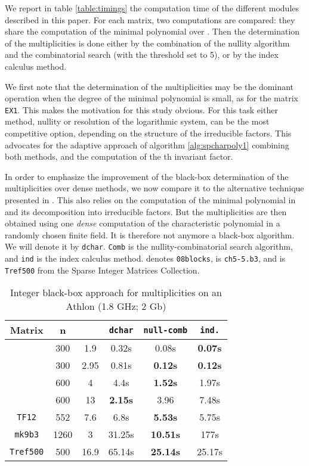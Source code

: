 \documentclass{article}
\begin{document}
We report in table \ref{table:timings} the computation time of the
different modules described in this paper. For each matrix, two computations are
compared: they share the computation of the minimal polynomial over . Then
the determination of the multiplicities is done either by the combination of the
nullity algorithm and the combinatorial search (with the threshold  set to 5), or by the index calculus method.

We first note that the determination of the multiplicities may be the dominant
operation when the degree of the minimal polynomial is small, as for the matrix
\texttt{EX1}. This makes the motivation for this study obvious.
For this task either method, nullity or resolution of the logarithmic system,
can be the most competitive option, depending on the structure of the irreducible
factors. This advocates for the adaptive approach of algorithm
\ref{alg:spcharpoly1} combining both methods, and the computation of the
th invariant factor.

In order to emphasize the improvement of the black-box determination of the
multiplicities over dense methods, we now compare it to the alternative technique presented in
\cite[\S 4.2.2]{jgd:2005:charp}. This also relies on the computation of the
minimal polynomial in  and its decomposition into irreducible factors. But
the multiplicities are then obtained using one \emph{dense} computation of the characteristic
polynomial in a randomly chosen finite field. It is
therefore not anymore a black-box algorithm. 
We will denote it by \texttt{dchar}.  \texttt{Comb} is the nullity-combinatorial
search algorithm, and \texttt{ind} is the index calculus method.  denotes \texttt{08blocks},  is \texttt{ch5-5.b3}, and  is \texttt{Tref500} from the Sparse Integer Matrices Collection.

\begin{table}[htbp]
\begin{center}
\begin{tabular}{cccccc}
\toprule
Matrix & n &  & \texttt{dchar} & \texttt{null-comb} &
\texttt{ind.}\\
\midrule
 & 300 & 1.9  & 0.32s & 0.08s & \textbf{0.07s}\\
          & 300 & 2.95 & 0.81s & \textbf{0.12s} & \textbf{0.12s}\\
   & 600 & 4    & 4.4s  & \textbf{1.52s} & 1.97s\\
          & 600 & 13   & \textbf{2.15s}  & 3.96  &7.48s \\
\texttt{TF12}         & 552 & 7.6  & 6.8s   & \textbf{5.53s} & 5.75s\\
\texttt{mk9b3}        & 1260 & 3   & 31.25s & \textbf{10.51s} & 177s \\ 
\texttt{Tref500}      & 500 & 16.9 & 65.14s & \textbf{25.14s} & 25.17s\\
\bottomrule
\end{tabular}
\end{center}
\caption{Integer black-box approach for 
  multiplicities on an Athlon (1.8 GHz; 2 Gb)}
\label{tab:ciavsbn}
\end{table}
\end{document}
